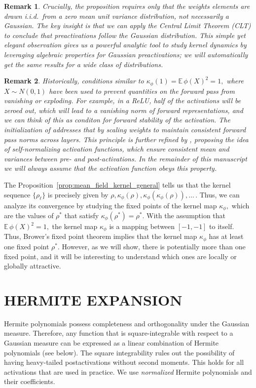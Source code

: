 \documentclass[twoside]{article}
\newcommand{\km}{\kappa_\phi}
\newcommand{\E}{\mathbb{E}\,}
\newtheorem{remark}{Remark}
\theoremstyle{definition}
\begin{document}
\begin{remark}
    Crucially, the proposition requires only that the weights elements are drawn i.i.d.~from a zero mean unit variance distribution, not necessarily a Gaussian. The key insight is that we can apply the Central Limit Theorem (CLT) to conclude that preactivations follow the Gaussian distribution. This simple yet elegant observation gives us a powerful analytic tool to study kernel dynamics by leveraging algebraic properties for Gaussian preactivations; we will automatically get the same results for a wide class of distributions. 
\end{remark}

\begin{remark}
    Historically, conditions similar to $\km(1) = \E \phi(X)^2 = 1,$ where $X\sim N(0,1)$ have been used to prevent quantities on the forward pass from vanishing or exploding. For example, in a ReLU, half of the activations will be zeroed out, which will lead to a vanishing norm of forward representations, and we can think of this as conditon for \emph{forward stability} of the activation. The initialization of
\citep{he2016deep} addresses that by scaling weights to maintain consistent forward pass norms across layers. This principle is further refined by \citet{klambauer2017self}, proposing the idea of self-normalizing activation functions, which ensure consistent mean and variances between pre- and post-activations. In the remainder of this manuscript we will always assume that the activation function obeys this property. 
\end{remark}


The Proposition~\ref{prop:mean_field_kernel_general} tells us that the kernel sequence $\{\rho_\ell\}$ is precisely given by $\rho,\km(\rho),\km(\km(\rho)),\dots\,.$ Thus, we can analyze its convergence by studying the fixed points of the kernel map $\km,$
which are the values of $\rho^*$ that satisfy $\km(\rho^*) = \rho^*.$  With the assumption that $\E \phi(X)^2=1,$ the kernel map $\km$ is a mapping between $[-1,-1]$ to itself. Thus, Brower's fixed point theorem implies that the kernel map $\km$ has at least one fixed point $\rho^*.$ However, as we will show, there is potentially more than one fixed point, and it will be interesting to understand which ones are locally or globally attractive. 


\section{HERMITE EXPANSION}
Hermite polynomials possess completeness and orthogonality under the Gaussian measure. Therefore, any function that is square-integrable with respect to a Gaussian measure can be expressed as a linear combination of Hermite polynomials (see below). The square integrability rules out the possibility of having heavy-tailed postactivations without second moments. This holds for all activations that are used in practice. We use \emph{normalized} Hermite polynomials and their coefficients. 
\end{document}
